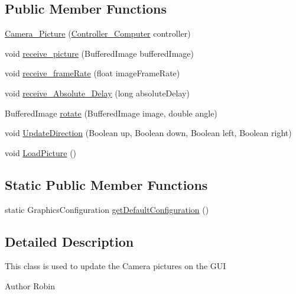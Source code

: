 \subsection*{Public Member Functions}
\begin{DoxyCompactItemize}
\item 
\hyperlink{class_controller_1_1_camera___picture_a589e3c562cdf23fb69a7864471af5303}{Camera\+\_\+\+Picture} (\hyperlink{class_controller_1_1_controller___computer}{Controller\+\_\+\+Computer} controller)
\item 
void \hyperlink{class_controller_1_1_camera___picture_a6c023933f9516c247c15326db445966c}{receive\+\_\+picture} (Buffered\+Image buffered\+Image)
\item 
void \hyperlink{class_controller_1_1_camera___picture_afe733efc2cf1f1fe71141b4c466c2674}{receive\+\_\+frame\+Rate} (float image\+Frame\+Rate)
\item 
void \hyperlink{class_controller_1_1_camera___picture_a3883b0d69985579ea902b4e45a7bbb40}{receive\+\_\+\+Absolute\+\_\+\+Delay} (long absolute\+Delay)
\item 
Buffered\+Image \hyperlink{class_controller_1_1_camera___picture_ab9a5398690a1bcf7795765cb1b0c627a}{rotate} (Buffered\+Image image, double angle)
\item 
void \hyperlink{class_controller_1_1_camera___picture_af29e712d375616bb2275215f3ebdc397}{Update\+Direction} (Boolean up, Boolean down, Boolean left, Boolean right)
\item 
void \hyperlink{class_controller_1_1_camera___picture_a8238414f569f7b746f538415c19580ee}{Load\+Picture} ()
\end{DoxyCompactItemize}
\subsection*{Static Public Member Functions}
\begin{DoxyCompactItemize}
\item 
static Graphics\+Configuration \hyperlink{class_controller_1_1_camera___picture_a345ae0eb8eb73488d7ca71507517e418}{get\+Default\+Configuration} ()
\end{DoxyCompactItemize}


\subsection{Detailed Description}
This class is used to update the Camera pictures on the G\+U\+I \begin{DoxyAuthor}{Author}
Robin 
\end{DoxyAuthor}


